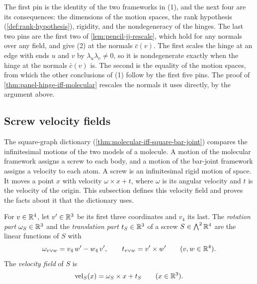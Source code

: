 \begin{fmlnote}
  The first pin is the identity of the two frameworks in (1), and the
  next four are its consequences: the dimensions of the motion spaces,
  the rank hypothesis (\cref{def:rank-hypothesis}), rigidity, and the
  nondegeneracy of the hinges. The last two pins are the first two of
  \cref{lem:pencil-jj-rescale}, which hold for any normals over any
  field, and give (2) at the normals $\bar c(v)$. The first scales the
  hinge at an edge with ends $u$ and $v$ by
  $\lambda_u \lambda_v \neq 0$, so it is nondegenerate exactly when the
  hinge at the normals $\bar c(v)$ is. The second is the equality of the
  motion spaces, from which the other conclusions of (1) follow by the
  first five pins. The proof of \cref{thm:panel-hinge-iff-molecular}
  rescales the normals it uses directly, by the argument above.
\end{fmlnote}

\subsection{Screw velocity fields}
\label{sec:molecule-modelling-velocity}

The square-graph dictionary (\cref{thm:molecular-iff-square-bar-joint})
compares the infinitesimal motions of the two models of a molecule. A
motion of the molecular framework assigns a screw to each body, and a
motion of the bar-joint framework assigns a velocity to each atom. A
screw is an infinitesimal rigid motion of space. It moves a point $x$
with velocity $\omega \times x + t$, where $\omega$ is its angular
velocity and $t$ is the velocity of the origin. This subsection defines
this velocity field and proves the facts about it that the dictionary
uses.

\begin{definition}
  \label{def:screw-velocity}
  \leanok
  For $v \in {\mathbb{R}}^4$, let $v' \in {\mathbb{R}}^3$ be its first three coordinates
  and $v_4$ its last. The \emph{rotation part} $\omega_S \in {\mathbb{R}}^3$ and
  the \emph{translation part} $t_S \in {\mathbb{R}}^3$ of a screw
  $S \in \bigwedge^2 {\mathbb{R}}^4$ are the linear functions of $S$ with
  \[
    \omega_{v \vee w} = v_4\, w' - w_4\, v', \qquad
    t_{v \vee w} = v' \times w' \qquad (v, w \in {\mathbb{R}}^4).
  \]
  The \emph{velocity field} of $S$ is
  \[
    \mathrm{vel}_S(x) = \omega_S \times x + t_S \qquad (x \in {\mathbb{R}}^3).
  \]
\end{definition}

